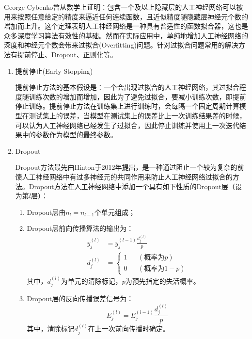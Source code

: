 \documentclass[a4paper]{ctexart}
\begin{document}
George Cybenko曾从数学上证明：包含一个及以上隐藏层的人工神经网络可以被用来按照任意给定的精度来逼近任何连续函数，且近似精度随隐藏层神经元个数的增加而上升\cite{RN122}。这个定理表明人工神经网络是一种具有普适性的函数拟合器，这也是众多深度学习算法有效性的基础。然而在实际应用中，单纯地增加人工神经网络的深度和神经元个数会带来过拟合(Overfitting)问题。针对过拟合问题常用的解决方法有提前停止、Dropout、正则化等。
\begin{enumerate}
	\item 提前停止(Early Stopping)

	      提前停止方法的基本假设是：一个会出现过拟合的人工神经网络，其过拟合程度随训练次数的增加而增加\cite{RN134}，因此为了避免过拟合，要减小训练次数，即提前停止训练。提前停止方法在训练集上进行训练时，会每隔一个固定周期计算模型在测试集上的误差，当模型在测试集上的误差比上一次训练结果差的时候，可以认为人工神经网络已经发生了过拟合，因此停止训练并使用上一次迭代结果中的参数作为模型的最终参数\cite{RN2}。

	\item Dropout

	      Dropout方法最先由Hinton于2012年提出，是一种通过阻止一个较为复杂的前馈人工神经网络中有过多神经元的共同作用来防止人工神经网络过拟合的方法\cite{RN133}。Dropout方法在人工神经网络中添加一个具有如下性质的Dropout层（设为第$l$层）：
	      \begin{enumerate}[label=(\arabic*)]
		      \item Dropout层由$n_l=n_{l-1}$个单元组成；
		      \item Dropout层前向传播算法的输出为：
		            \begin{equation}
			            \begin{split}
				            y_j^{(l)}&=y_j^{(l-1)}\frac{d_j^{(l)}}{p}\\
				            d_j^{(l)}&=\left\{
				            \begin{aligned}
					            1 &  & (\mbox{概率为}p)   \\
					            0 &  & (\mbox{概率为}1-p)
				            \end{aligned}
				            \right.
			            \end{split}
		            \end{equation}
		            其中，$d_j^{(l)}$为单元的清除标记，$p$为预先指定的失活概率。
		      \item Dropout层的反向传播误差信号为：
		            \begin{equation}
			            E_j^{(l)}=E_j^{(l-1)}\frac{d_j^{(l)}}{p}
		            \end{equation}
		            其中，清除标记$d_j^{(l)}$在上一次前向传播时确定。
	      \end{enumerate}


\end{enumerate}
\end{document}
